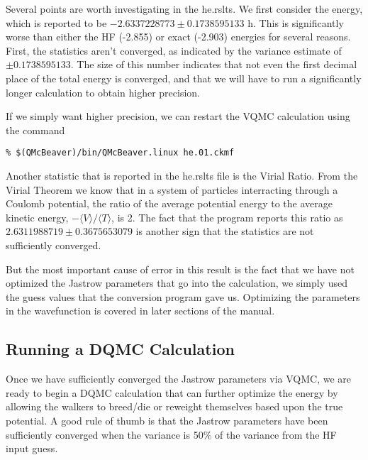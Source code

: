 \documentclass{article}
\begin{document}
Several points are worth investigating in the he.rslts. We first
consider the energy, which is reported to be $-2.6337228773 \pm
0.1738595133$ h. This is significantly worse than either the HF
(-2.855) or exact (-2.903) energies for several reasons. First, the
statistics aren't converged, as indicated by the variance estimate of
$\pm 0.1738595133$. The size of this number indicates that not even
the first decimal place of the total energy is converged, and that we
will have to run a significantly longer calculation to obtain higher
precision. 

If we simply want higher precision, we can restart the VQMC
calculation using the command
\begin{verbatim}
% $(QMcBeaver)/bin/QMcBeaver.linux he.01.ckmf
\end{verbatim}

Another statistic that is reported in the he.rslts file is the Virial
Ratio. From the Virial Theorem we know that in a system of particles
interracting through a Coulomb potential, the ratio of the average
potential energy to the average kinetic energy,
$-\langle V\rangle/\langle T \rangle$, is 2. The fact that the program
reports this ratio as $2.6311988719 \pm 0.3675653079$ is another sign
that the statistics are not sufficiently converged.

But the most important cause of error in this result is the fact that
we have not optimized the Jastrow parameters that go into the
calculation, we simply used the guess values that the conversion
program gave us.  Optimizing the parameters in the wavefunction is
covered in later sections of the manual.

\subsection{Running a DQMC Calculation}
Once we have sufficiently converged the Jastrow parameters via VQMC,
we are ready to begin a DQMC calculation that can further optimize the
energy by allowing the walkers to breed/die or reweight themselves
based upon the true potential. A good rule of thumb is that the
Jastrow parameters have been sufficiently converged when the variance
is 50\% of the variance from the HF input guess.


\end{document}

